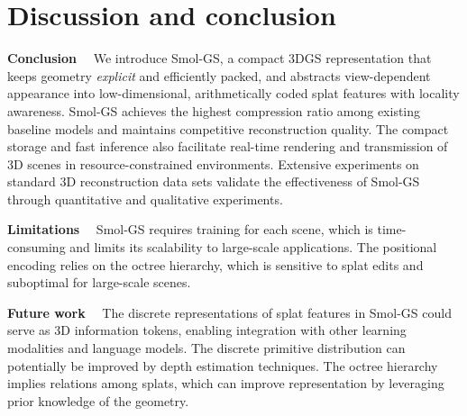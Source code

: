 \documentclass{article}
\newcommand{\ours}{Smol-GS\xspace}
\renewcommand{\paragraph}[1]{\noindent\textbf{#1}~~}
\begin{document}
%

%
\section{Discussion and conclusion}
\label{sec:discussion}
\paragraph{Conclusion} We introduce \ours, a compact 3DGS representation that keeps geometry \emph{explicit} and efficiently packed, and abstracts view-dependent appearance into low-dimensional, arithmetically coded splat features with locality awareness. \ours achieves the highest compression ratio among existing baseline models and maintains competitive reconstruction quality. The compact storage and fast inference also facilitate real-time rendering and transmission of 3D scenes in resource-constrained environments. Extensive experiments on standard 3D reconstruction data sets validate the effectiveness of \ours through quantitative and qualitative experiments. 

\paragraph{Limitations} \ours requires training for each scene, which is time-consuming and limits its scalability to large-scale applications. The positional encoding relies on the octree hierarchy, which is sensitive to splat edits and suboptimal for large-scale scenes.

%

\paragraph{Future work} The discrete representations of splat features in \ours could serve as 3D information tokens, enabling integration with other learning modalities and language models. The discrete primitive distribution can potentially be improved by depth estimation techniques. The octree hierarchy implies relations among splats, which can improve representation by leveraging prior knowledge of the geometry.




%
%
%
%
%

%
%
\end{document}
